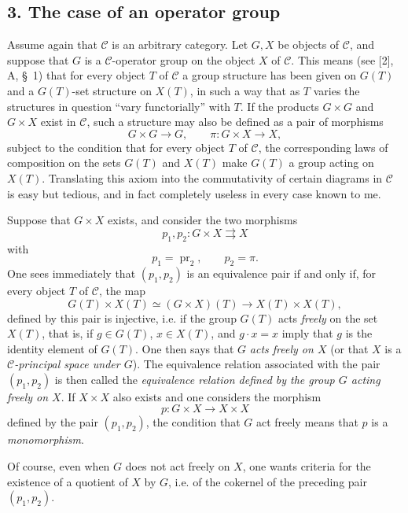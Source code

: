 \subsection*{3. The case of an operator group}

Assume again that $\mathcal C$ is an arbitrary category. Let $G,X$ be objects
of $\mathcal C$, and suppose that $G$ is a $\mathcal C$-operator group on the
object $X$ of $\mathcal C$. This means (see [2], A, \S~1) that for every
object $T$ of $\mathcal C$ a group structure has been given on $G(T)$ and a
$G(T)$-set structure on $X(T)$, in such a way that as $T$ varies the
structures in question ``vary functorially'' with $T$. If the products
$G\times G$ and $G\times X$ exist in $\mathcal C$, such a structure may also
be defined as a pair of morphisms
\[
  G\times G\longrightarrow G,
  \qquad \pi:G\times X\longrightarrow X,
\]
subject to the condition that for every object $T$ of $\mathcal C$, the
corresponding laws of composition on the sets $G(T)$ and $X(T)$ make $G(T)$ a
group acting on $X(T)$. Translating this axiom into the commutativity of
certain diagrams in $\mathcal C$ is easy but tedious, and in fact completely
useless in every case known to me.

Suppose that $G\times X$ exists, and consider the two morphisms
\[
  p_1,p_2:G\times X\rightrightarrows X
\]
with
\[
  p_1=\operatorname{pr}_2,\qquad p_2=\pi.
\]
One sees immediately that $(p_1,p_2)$ is an equivalence pair if and only if,
for every object $T$ of $\mathcal C$, the map
\[
  G(T)\times X(T)\simeq(G\times X)(T)
  \longrightarrow X(T)\times X(T),
\]
defined by this pair is injective, i.e. if the group $G(T)$ acts
\emph{freely} on the set $X(T)$, that is, if $g\in G(T)$, $x\in X(T)$, and
$g\cdot x=x$ imply that $g$ is the identity element of $G(T)$. One then says
that $G$ \emph{acts freely on $X$} (or that $X$ is a
\emph{$\mathcal C$-principal space under $G$}). The equivalence relation
associated with the pair $(p_1,p_2)$ is then called the \emph{equivalence
relation defined by the group $G$ acting freely on $X$}. If $X\times X$ also
exists and one considers the morphism
\[
  p:G\times X\longrightarrow X\times X
\]
defined by the pair $(p_1,p_2)$, the condition that $G$ act freely means that
$p$ is a \emph{monomorphism}.

Of course, even when $G$ does not act freely on $X$, one wants criteria for
the existence of a quotient of $X$ by $G$, i.e. of the cokernel of the
preceding pair $(p_1,p_2)$.

